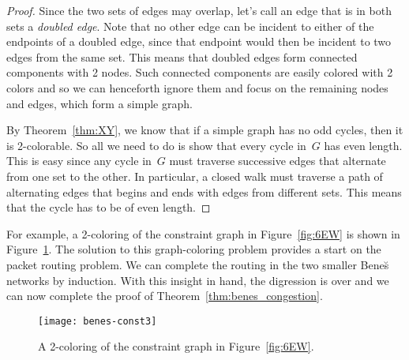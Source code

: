 \begin{proof}
Since the two sets of edges may overlap, let's call an edge that is in
both sets a \emph{doubled edge}.  Note that no other edge can be
incident to either of the endpoints of a doubled edge, since that
endpoint would then be incident to two edges from the same set.  This
means that doubled edges form connected components with 2 nodes.  Such
connected components are easily colored with 2 colors and so we can
henceforth ignore them and focus on the remaining nodes and edges,
which form a simple graph.

By Theorem~\ref{thm:XY}, we know that if a simple graph has no odd
cycles, then it is 2-colorable.  So all we need to do is show that
every cycle in~$G$ has even length.  This is easy since any cycle
in~$G$ must traverse successive edges that alternate from one set to
the other.  In particular, a closed walk must traverse a path of
alternating edges that begins and ends with edges from different sets.
This means that the cycle has to be of even length.
\end{proof}

For example, a 2-coloring of the constraint graph in
Figure~\ref{fig:6EW} is shown in Figure~\ref{fig:6EX}.  The solution
to this graph-coloring problem provides a start on the packet routing
problem.  We can complete the routing in the two smaller Bene\u{s}
networks by induction.  With this insight in hand, the digression is
over and we can now complete the proof of
Theorem~\ref{thm:benes_congestion}.

\begin{figure}

\texttt{[image: benes-const3]}

\caption{A 2-coloring of the constraint graph in
  Figure~\ref{fig:6EW}.}

\label{fig:6EX}

\end{figure}

